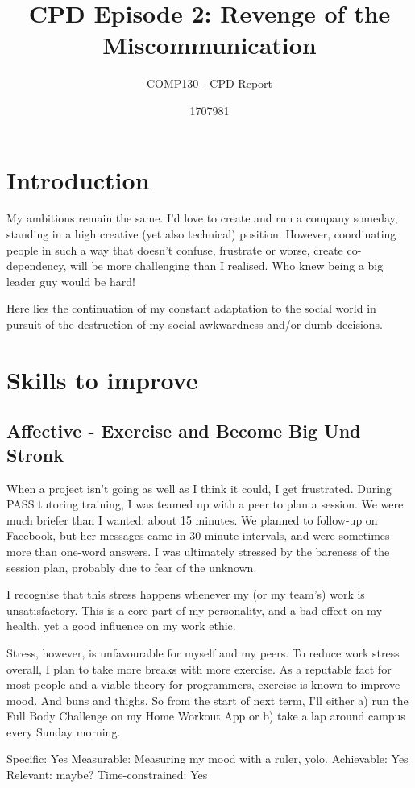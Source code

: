 \documentclass{scrartcl}
\title{CPD Episode 2: Revenge of the Miscommunication}
\subtitle{COMP130 - CPD Report}
\author{1707981}
\begin{document}
\maketitle

\section{Introduction} %
My ambitions remain the same. I'd love to create and run a company someday, standing in a high creative (yet also technical) position. However, coordinating people in such a way that doesn't confuse, frustrate or worse, create co-dependency, will be more challenging than I realised. Who knew being a big leader guy would be hard!

Here lies the continuation of my constant adaptation to the social world in pursuit of the destruction of my social awkwardness and/or dumb decisions.

\section{Skills to improve}
\subsection{Affective - Exercise and Become Big Und Stronk} %
When a project isn't going as well as I think it could, I get frustrated. During PASS tutoring training, I was teamed up with a peer to plan a session. We were much briefer than I wanted: about 15 minutes. We planned to follow-up on Facebook, but her messages came in 30-minute intervals, and were sometimes more than one-word answers. I was ultimately stressed by the bareness of the session plan, probably due to fear of the unknown.

I recognise that this stress happens whenever my (or my team's) work is unsatisfactory. This is a core part of my personality, and a bad effect on my health, yet a good influence on my work ethic.

Stress, however, is unfavourable for myself and my peers. To reduce work stress overall, I plan to take more breaks with more exercise. As a reputable fact for most people and a viable theory for programmers, exercise is known to improve mood. And buns and thighs. So from the start of next term, I'll either a) run the Full Body Challenge on my Home Workout App or b) take a lap around campus every Sunday morning.

Specific: Yes
Measurable: Measuring my mood with a ruler, yolo.
Achievable: Yes
Relevant: maybe?
Time-constrained: Yes
\end{document}

